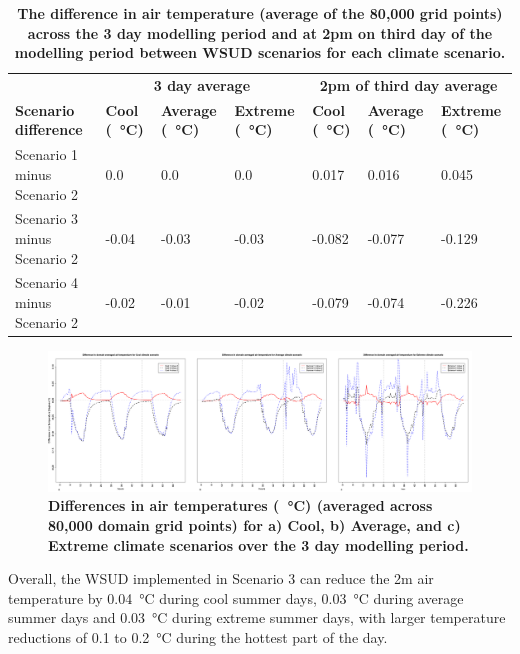 \documentclass[final,3p,times,authoryear]{elsarticle}
\begin{document}
\begin{table}[!htbp]
\caption{\bf The difference in air temperature (average of the 80,000 grid points) across the 3 day modelling period and at 2pm on third day of the modelling period between WSUD scenarios for each climate scenario.  \label{tab:scenarioDiff}}     
\begin{tabular}{ l l l l l l l}
 \hline  \multicolumn{1}{|c}{}   &  \multicolumn{3}{|c|}{\textbf{3 day average}} & \multicolumn{3}{c|}{\textbf{2pm of third day average}}  \\
\textbf{Scenario difference} 
& \textbf{Cool (\SI{}{\degreeCelsius})}
& \textbf{Average (\SI{}{\degreeCelsius})}
& \textbf{Extreme (\SI{}{\degreeCelsius})}
& \textbf{Cool (\SI{}{\degreeCelsius})}
& \textbf{Average (\SI{}{\degreeCelsius})}
& \textbf{Extreme (\SI{}{\degreeCelsius})}
\\ \hline
Scenario 1 minus Scenario 2 & 0.0  & 0.0 & 0.0       &0.017&0.016&0.045\\ 
Scenario 3 minus Scenario 2 & -0.04  & -0.03 & -0.03 &-0.082&-0.077&-0.129\\ 
Scenario 4 minus Scenario 2 & -0.02  & -0.01 & -0.02 &-0.079&-0.074&-0.226\\ 
\hline
\end{tabular}
\end{table}

						
								



\begin{figure}[!htbp]
\centering   
\includegraphics[scale=0.25]{images/temperatures/SunburyAll}
\caption{\bf Differences in air temperatures (\SI{}{\degreeCelsius}) (averaged across 80,000 domain grid points) for a) Cool, b) Average, and c) Extreme climate scenarios over the 3 day modelling period. }    
 \label{fig:diff_air_temp} 
\end{figure} 


Overall, the WSUD implemented in Scenario 3 can reduce the 2m air temperature by 0.04\SI{}{\degreeCelsius} during cool summer days, 0.03\SI{}{\degreeCelsius} during average summer days and 0.03\SI{}{\degreeCelsius} during extreme summer days, with larger temperature reductions of 0.1 to 0.2\SI{}{\degreeCelsius} during the hottest part of the day.
\end{document}
